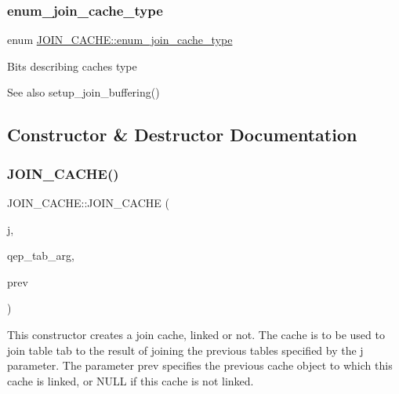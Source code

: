 \subsubsection{\texorpdfstring{enum\+\_\+join\+\_\+cache\+\_\+type}{enum\_join\_cache\_type}}
{\footnotesize\ttfamily enum \mbox{\hyperlink{classJOIN__CACHE_a74b45254b4573b9531f1b8b536b18e46}{J\+O\+I\+N\+\_\+\+C\+A\+C\+H\+E\+::enum\+\_\+join\+\_\+cache\+\_\+type}}}

Bits describing cache\textquotesingle{}s type \begin{DoxySeeAlso}{See also}
setup\+\_\+join\+\_\+buffering() 
\end{DoxySeeAlso}


\subsection{Constructor \& Destructor Documentation}
\mbox{\label{classJOIN__CACHE_aa744a4af8aa982a64f2334b141e63026}} 
\subsubsection{\texorpdfstring{J\+O\+I\+N\+\_\+\+C\+A\+C\+H\+E()}{JOIN\_CACHE()}}
{\footnotesize\ttfamily J\+O\+I\+N\+\_\+\+C\+A\+C\+H\+E\+::\+J\+O\+I\+N\+\_\+\+C\+A\+C\+HE (\begin{DoxyParamCaption}\item[{\mbox{\hyperlink{classJOIN}{J\+O\+IN}} $\ast$}]{j,  }\item[{\mbox{\hyperlink{classQEP__TAB}{Q\+E\+P\+\_\+\+T\+AB}} $\ast$}]{qep\+\_\+tab\+\_\+arg,  }\item[{\mbox{\hyperlink{classJOIN__CACHE}{J\+O\+I\+N\+\_\+\+C\+A\+C\+HE}} $\ast$}]{prev }\end{DoxyParamCaption})\hspace{0.3cm}{\ttfamily [inline]}}

This constructor creates a join cache, linked or not. The cache is to be used to join table \textquotesingle{}tab\textquotesingle{} to the result of joining the previous tables specified by the \textquotesingle{}j\textquotesingle{} parameter. The parameter \textquotesingle{}prev\textquotesingle{} specifies the previous cache object to which this cache is linked, or N\+U\+LL if this cache is not linked. 

